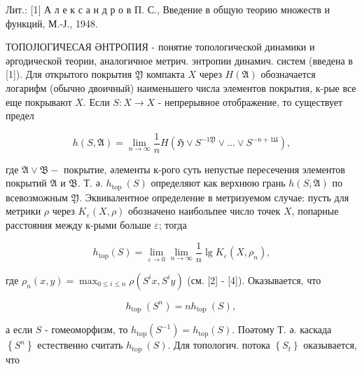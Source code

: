 \documentclass[10pt]{article}
\begin{document}
Лит.: [1] А л е к с а н д р о в П. С., Введение в общую теорию множеств и функций, М.-Ј., 1948.



ТОПОЈІОГИЧЕСАЯ ӘНТРОПИЯ - понятие топологической динамики и әргодической теории, аналогичное метрич. энтропии динамич. систем (введена в [1]). Для открытого покрытия $\mathfrak{Y}$ компакта $X$ через $H(\mathfrak{A})$ обозначается логарифм (обычно двоичный) наименьшего числа элементов покрытия, к-рые все еще покрывают $X$. Если $S: X \rightarrow X$ - непрерывное отображение, то существует предел



\[

h(S, \mathfrak{A})=\lim _{n \rightarrow \infty} \frac{1}{n} H\left(\mathfrak{H} \vee S^{-1 \mathfrak{Y}} \vee \ldots \vee S^{-n+1 \mathfrak{U}}\right),

\]



где $\mathfrak{A} \vee \mathfrak{B}-$ покрытие, әлементы к-рого суть непустые пересечения элементов покрытий $\mathfrak{A}$ и $\mathfrak{B}$. Т. ә. $h_{\text {top }}(S)$ определяют как верхнюю грань $h(S, \mathfrak{A})$ по всевозможным $\mathfrak{Y}$. Эквивалентное определение в метризуемом случае: пусть для метрики $\rho$ через $K_{\varepsilon}(X, \rho)$ обозначено наибольпее число точек $X$, попарные расстояния между к-рыми больше $\varepsilon$; тогда



\[

h_{\mathrm{top}}(S)=\lim _{\varepsilon \rightarrow 0} \lim _{n \rightarrow \infty} \frac{1}{n} \lg K_{\varepsilon}\left(X, \rho_{n}\right),

\]



где $\rho_{n}(x, y)=\max _{0 \leqslant i \leqslant n} \rho\left(S^{i} x, S^{i} y\right)$ (см. [2] - [4]). Оказывается, что



\[

h_{\text {top }}\left(S^{n}\right)=n h_{\text {top }}(S) \text {, }

\]



а если $S$ - гомеоморфизм, то $h_{\mathrm{top}}\left(S^{-1}\right)=h_{\mathrm{top}}(S)$. Поәтому Т. ә. каскада $\left\{S^{n}\right\}$ естественно считать $h_{\text {top }}(S)$. Для топологич. потока $\left\{S_{t}\right\}$ оказывается, что
\end{document}
